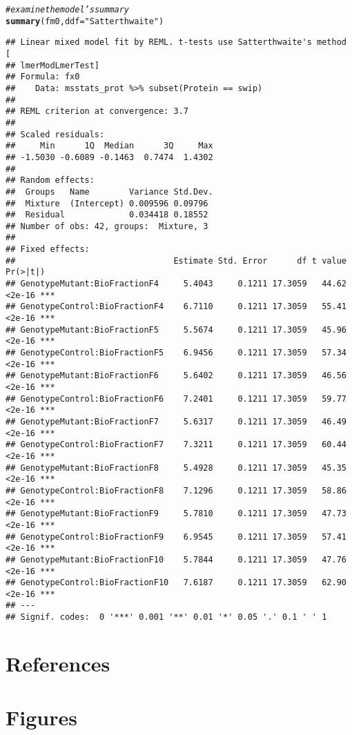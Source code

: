 \documentclass[11pt]{elife}\usepackage[]{graphicx}\usepackage[]{color}
\makeatletter
\newcommand{\hlstr}[1]{\textcolor[rgb]{0.192,0.494,0.8}{#1}}%
\newcommand{\hlcom}[1]{\textcolor[rgb]{0.678,0.584,0.686}{\textit{#1}}}%
\newcommand{\hlstd}[1]{\textcolor[rgb]{0.345,0.345,0.345}{#1}}%
\newcommand{\hlkwc}[1]{\textcolor[rgb]{0.333,0.667,0.333}{#1}}%
\newcommand{\hlkwd}[1]{\textcolor[rgb]{0.737,0.353,0.396}{\textbf{#1}}}%
\newenvironment{kframe}{%
 \def\at@end@of@kframe{}%
 \ifinner\ifhmode%
  \def\at@end@of@kframe{\end{minipage}}%
  \begin{minipage}{\columnwidth}%
 \fi\fi%
 \def\FrameCommand##1{\hskip\@totalleftmargin \hskip-\fboxsep
 \colorbox{shadecolor}{##1}\hskip-\fboxsep
     \hskip-\linewidth \hskip-\@totalleftmargin \hskip\columnwidth}%
 \MakeFramed {\advance\hsize-\width
   \@totalleftmargin\z@ \linewidth\hsize
   \@setminipage}}%
 {\par\unskip\endMakeFramed%
 \at@end@of@kframe}
\newenvironment{knitrout}{}{} %
\makeatother
\begin{document}
\begin{knitrout}
\begin{kframe}
\begin{alltt}
\hlcom{# examine the model's summary}
\hlkwd{summary}\hlstd{(fm0,} \hlkwc{ddf} \hlstd{=} \hlstr{"Satterthwaite"}\hlstd{)}
\end{alltt}
\begin{verbatim}
## Linear mixed model fit by REML. t-tests use Satterthwaite's method [
## lmerModLmerTest]
## Formula: fx0
##    Data: msstats_prot %>% subset(Protein == swip)
## 
## REML criterion at convergence: 3.7
## 
## Scaled residuals: 
##     Min      1Q  Median      3Q     Max 
## -1.5030 -0.6089 -0.1463  0.7474  1.4302 
## 
## Random effects:
##  Groups   Name        Variance Std.Dev.
##  Mixture  (Intercept) 0.009596 0.09796 
##  Residual             0.034418 0.18552 
## Number of obs: 42, groups:  Mixture, 3
## 
## Fixed effects:
##                                Estimate Std. Error      df t value Pr(>|t|)    
## GenotypeMutant:BioFractionF4     5.4043     0.1211 17.3059   44.62   <2e-16 ***
## GenotypeControl:BioFractionF4    6.7110     0.1211 17.3059   55.41   <2e-16 ***
## GenotypeMutant:BioFractionF5     5.5674     0.1211 17.3059   45.96   <2e-16 ***
## GenotypeControl:BioFractionF5    6.9456     0.1211 17.3059   57.34   <2e-16 ***
## GenotypeMutant:BioFractionF6     5.6402     0.1211 17.3059   46.56   <2e-16 ***
## GenotypeControl:BioFractionF6    7.2401     0.1211 17.3059   59.77   <2e-16 ***
## GenotypeMutant:BioFractionF7     5.6317     0.1211 17.3059   46.49   <2e-16 ***
## GenotypeControl:BioFractionF7    7.3211     0.1211 17.3059   60.44   <2e-16 ***
## GenotypeMutant:BioFractionF8     5.4928     0.1211 17.3059   45.35   <2e-16 ***
## GenotypeControl:BioFractionF8    7.1296     0.1211 17.3059   58.86   <2e-16 ***
## GenotypeMutant:BioFractionF9     5.7810     0.1211 17.3059   47.73   <2e-16 ***
## GenotypeControl:BioFractionF9    6.9545     0.1211 17.3059   57.41   <2e-16 ***
## GenotypeMutant:BioFractionF10    5.7844     0.1211 17.3059   47.76   <2e-16 ***
## GenotypeControl:BioFractionF10   7.6187     0.1211 17.3059   62.90   <2e-16 ***
## ---
## Signif. codes:  0 '***' 0.001 '**' 0.01 '*' 0.05 '.' 0.1 ' ' 1
\end{verbatim}
\end{kframe}
\end{knitrout}


\section{References}




\section{Figures}


\end{document}
